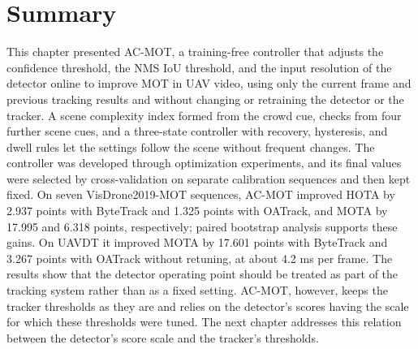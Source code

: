 \section{Summary}\label{sec:ac-summary}
This chapter presented AC-MOT, a training-free controller that adjusts the confidence threshold, the NMS IoU threshold, and the input resolution of the detector online to improve MOT in UAV video, using only the current frame and previous tracking results and without changing or retraining the detector or the tracker. A scene complexity index formed from the crowd cue, checks from four further scene cues, and a three-state controller with recovery, hysteresis, and dwell rules let the settings follow the scene without frequent changes. The controller was developed through optimization experiments, and its final values were selected by cross-validation on separate calibration sequences and then kept fixed. On seven VisDrone2019-MOT sequences, AC-MOT improved HOTA by 2.937 points with ByteTrack and 1.325 points with OATrack, and MOTA by 17.995 and 6.318 points, respectively; paired bootstrap analysis supports these gains. On UAVDT it improved MOTA by 17.601 points with ByteTrack and 3.267 points with OATrack without retuning, at about 4.2 ms per frame. The results show that the detector operating point should be treated as part of the tracking system rather than as a fixed setting. AC-MOT, however, keeps the tracker thresholds as they are and relies on the detector's scores having the scale for which these thresholds were tuned. The next chapter addresses this relation between the detector's score scale and the tracker's thresholds.
